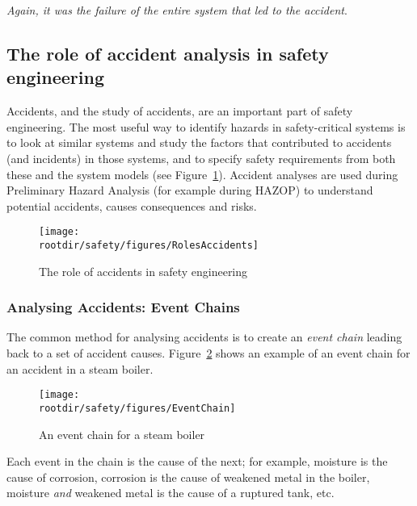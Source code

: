 \emph{Again, it was the failure of the entire system that led to the accident}.




  \subsection{The role of accident analysis in safety engineering}


Accidents, and the study of accidents, are an important part of safety engineering. The most useful way to identify hazards in safety-critical systems is to look at similar systems and study the factors that contributed to accidents (and incidents) in those systems, and to specify safety requirements from both these and the system models (see Figure~\ref{fig:safety:RolesAccidents}).  Accident analyses are used during Preliminary Hazard Analysis (for example during HAZOP) to understand potential accidents, causes  consequences and risks.



  \begin{figure}[!h]
    \centering
    \texttt{[image: \\rootdir/safety/figures/RolesAccidents]}
    \caption{The role of accidents in safety engineering}
    \label{fig:safety:RolesAccidents}
  \end{figure}  



  \subsubsection*{Analysing Accidents: Event Chains}

  The common method for analysing accidents is to create an \emph{event
    chain} leading back to a set of accident causes. Figure~\ref{fig:safety:EventChain} shows an example of an event chain for an accident in a steam boiler.

  \begin{figure}[!h]
    \centering 
    \texttt{[image: \\rootdir/safety/figures/EventChain]}
    \caption{An event chain for a steam boiler}
    \label{fig:safety:EventChain}
  \end{figure}

  Each event in the chain is the cause of the next; for example, moisture is
  the cause of corrosion, corrosion is the cause of weakened metal in the
  boiler, moisture \emph{and} weakened metal is the cause of a ruptured tank, etc.

